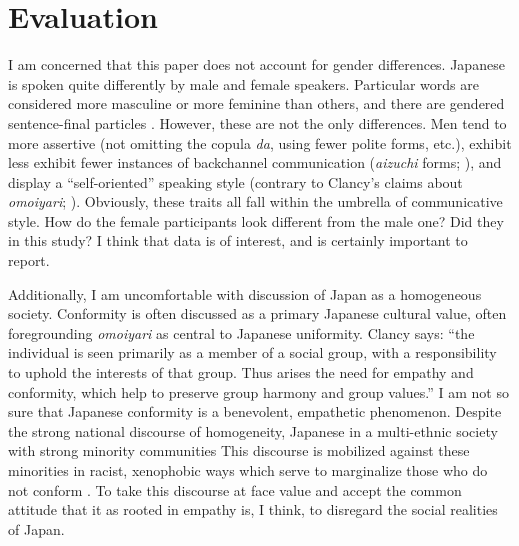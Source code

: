 \documentclass[man,12pt,natbib]{apa6}
\begin{document}
\section{Evaluation}

I am concerned that this paper does not account for gender differences.
Japanese is spoken quite differently by male and female speakers. Particular
words are considered more masculine or more feminine than others, and there are
gendered sentence-final particles \citep{Siegal03}. However, these are not the
only differences. Men tend to more assertive (not omitting the copula
\emph{da}, using fewer polite forms, etc.), exhibit less exhibit fewer
instances of backchannel communication (\emph{aizuchi} forms;
\citealp{Kita07,Tanaka04}), and display a ``self-oriented'' speaking style
(contrary to Clancy's claims about \emph{omoiyari}; \citealp{Itakura04}).
Obviously, these traits all fall within the umbrella of communicative style.
How do the female participants look different from the male one? Did they in
this study? I think that data is of interest, and is certainly important to
report.

Additionally, I am uncomfortable with discussion of Japan as a homogeneous
society. Conformity is often discussed as a primary Japanese cultural value,
often foregrounding \emph{omoiyari} as central to Japanese uniformity. Clancy
says: ``the individual is seen primarily as a member of a social group, with a
responsibility to uphold the interests of that group. Thus arises the need for
empathy and conformity, which help to preserve group harmony and group
values.'' I am not so sure that Japanese conformity is a benevolent, empathetic
phenomenon.  Despite the strong national discourse of homogeneity, Japanese in
a multi-ethnic society with strong minority communities \citep{Lie01} This
discourse is mobilized against these minorities in racist, xenophobic ways
which serve to marginalize those who do not conform \citep{Diene06}. To take
this discourse at face value and accept the common attitude that it as rooted
in empathy is, I think, to disregard the social realities of Japan.






\clearpage

\end{document}
